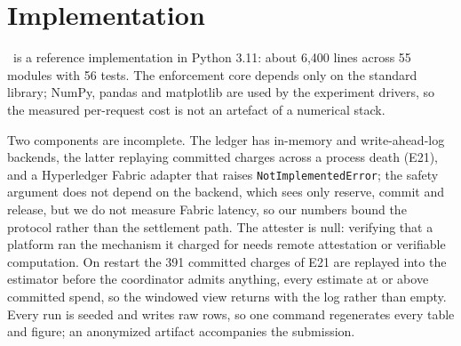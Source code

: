 \section{Implementation}
\label{sec:impl}

\sys\ is a reference implementation in Python 3.11: about 6{,}400 lines across 55
modules with 56 tests. The enforcement core depends only on the standard
library; NumPy, pandas and matplotlib are used by the experiment drivers, so the
measured per-request cost is not an artefact of a numerical stack.

Two components are incomplete. The ledger has in-memory and write-ahead-log backends,
the latter replaying committed charges across a process death (E21), and a Hyperledger
Fabric adapter that raises \texttt{NotImplementedError}; the safety argument does not
depend on the backend, which sees only reserve, commit and release, but we do not
measure Fabric latency, so our numbers bound the protocol rather than the settlement
path. The attester is null: verifying that a platform ran the mechanism it charged for
needs remote attestation or verifiable computation. On restart the 391 committed charges of E21 are replayed into the estimator before
the coordinator admits anything, every estimate at or above committed spend, so the
windowed view returns with the log rather than empty. Every run is seeded and writes raw rows, so one command regenerates every
table and figure; an anonymized artifact accompanies the submission.
